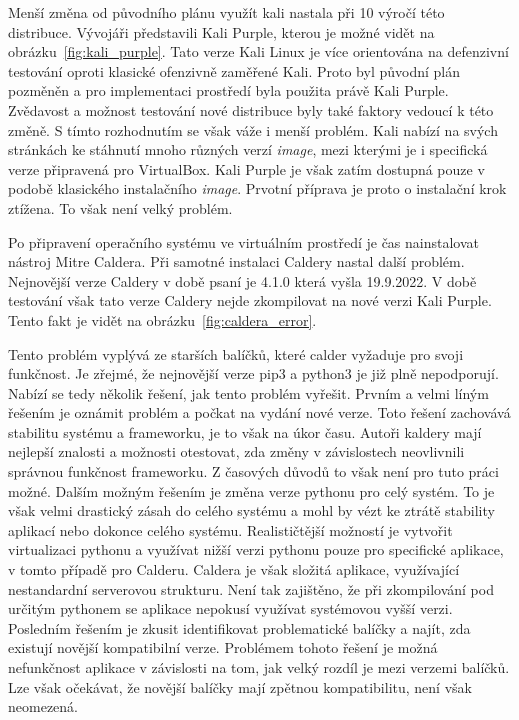 
Menší změna od původního plánu využít kali nastala při 10 výročí této distribuce\cite{kali_purple}.
Vývojáři představili Kali Purple, kterou je možné vidět na obrázku~\ref{fig:kali_purple}.
Tato verze Kali Linux je více orientována na defenzivní testování oproti klasické ofenzivně zaměřené Kali.
Proto byl původní plán pozměněn a pro implementaci prostředí byla použita právě Kali Purple.
Zvědavost a možnost testování nové distribuce byly také faktory vedoucí k této změně.
S tímto rozhodnutím se však váže i menší problém.
Kali nabízí na svých stránkách ke stáhnutí mnoho různých verzí \textit{image}, mezi kterými je i specifická verze připravená pro VirtualBox.
Kali Purple je však zatím dostupná pouze v podobě klasického instalačního \textit{image}.
Prvotní příprava je proto o instalační krok ztížena.
To však není velký problém.

Po připravení operačního systému ve virtuálním prostředí je čas nainstalovat nástroj Mitre Caldera.
Při samotné instalaci Caldery nastal další problém.
Nejnovější verze Caldery v době psaní je 4.1.0 která vyšla 19.9.2022.
V době testování však tato verze Caldery nejde zkompilovat na nové verzi Kali Purple.
Tento fakt je vidět na obrázku~\ref{fig:caldera_error}.


\noindent Tento problém vyplývá ze starších balíčků, které calder vyžaduje pro svoji funkčnost.
Je zřejmé, že nejnovější verze pip3 a python3 je již plně nepodporují.
Nabízí se tedy několik řešení, jak tento problém vyřešit.
Prvním a velmi líným řešením je oznámit problém a počkat na vydání nové verze.
Toto řešení zachovává stabilitu systému a frameworku, je to však na úkor času.
Autoři kaldery mají nejlepší znalosti a možnosti otestovat, zda změny v závislostech neovlivnili správnou funkčnost frameworku.
Z časových důvodů to však není pro tuto práci možné.
Dalším možným řešením je změna verze pythonu pro celý systém.
To je však velmi drastický zásah do celého systému a mohl by vézt ke ztrátě stability aplikací nebo dokonce celého systému.
Realističtější možností je vytvořit virtualizaci pythonu a využívat nižší verzi pythonu pouze pro specifické aplikace, v tomto případě pro Calderu.
Caldera je však složitá aplikace, využívající nestandardní serverovou strukturu.
Není tak zajištěno, že při zkompilování pod určitým pythonem se aplikace nepokusí využívat systémovou vyšší verzi.
Posledním řešením je zkusit identifikovat problematické balíčky a najít, zda existují novější kompatibilní verze.
Problémem tohoto řešení je možná nefunkčnost aplikace v závislosti na tom, jak velký rozdíl je mezi verzemi balíčků.
Lze však očekávat, že novější balíčky mají zpětnou kompatibilitu, není však neomezená.

